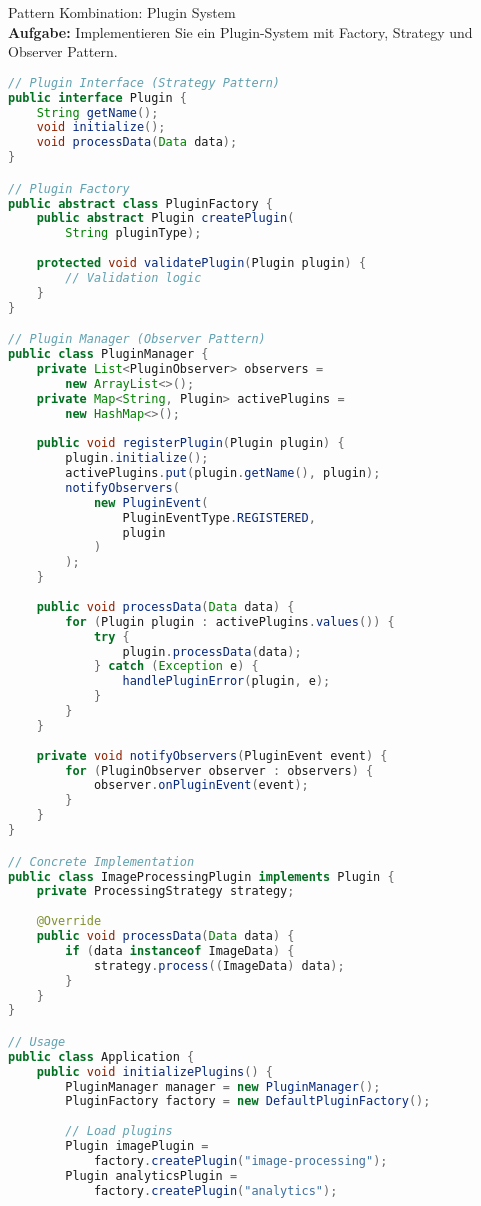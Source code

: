 \begin{example2}{Pattern Kombination: Plugin System}\\
\textbf{Aufgabe:} Implementieren Sie ein Plugin-System mit Factory, Strategy und Observer Pattern.

\begin{lstlisting}[language=Java, style=basesmol]
// Plugin Interface (Strategy Pattern)
public interface Plugin {
    String getName();
    void initialize();
    void processData(Data data);
}

// Plugin Factory
public abstract class PluginFactory {
    public abstract Plugin createPlugin(
        String pluginType);
        
    protected void validatePlugin(Plugin plugin) {
        // Validation logic
    }
}

// Plugin Manager (Observer Pattern)
public class PluginManager {
    private List<PluginObserver> observers = 
        new ArrayList<>();
    private Map<String, Plugin> activePlugins = 
        new HashMap<>();
        
    public void registerPlugin(Plugin plugin) {
        plugin.initialize();
        activePlugins.put(plugin.getName(), plugin);
        notifyObservers(
            new PluginEvent(
                PluginEventType.REGISTERED, 
                plugin
            )
        );
    }
    
    public void processData(Data data) {
        for (Plugin plugin : activePlugins.values()) {
            try {
                plugin.processData(data);
            } catch (Exception e) {
                handlePluginError(plugin, e);
            }
        }
    }
    
    private void notifyObservers(PluginEvent event) {
        for (PluginObserver observer : observers) {
            observer.onPluginEvent(event);
        }
    }
}

// Concrete Implementation
public class ImageProcessingPlugin implements Plugin {
    private ProcessingStrategy strategy;
    
    @Override
    public void processData(Data data) {
        if (data instanceof ImageData) {
            strategy.process((ImageData) data);
        }
    }
}

// Usage
public class Application {
    public void initializePlugins() {
        PluginManager manager = new PluginManager();
        PluginFactory factory = new DefaultPluginFactory();
        
        // Load plugins
        Plugin imagePlugin = 
            factory.createPlugin("image-processing");
        Plugin analyticsPlugin = 
            factory.createPlugin("analytics");
            

\end{lstlisting}
\end{example2}
